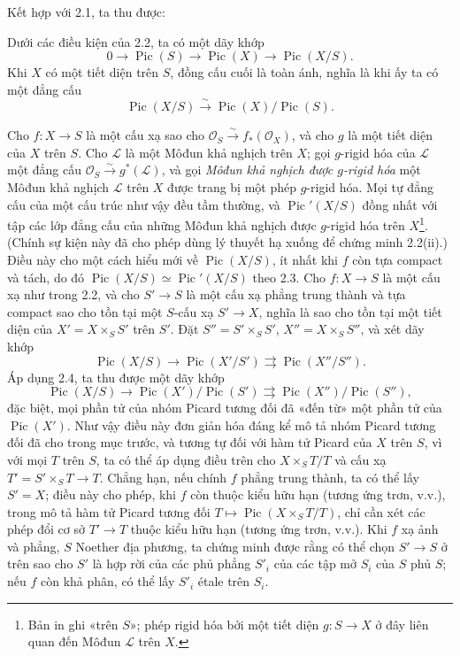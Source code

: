 Kết hợp với 2.1, ta thu được:

 Dưới các điều kiện của 2.2, ta có một dãy khớp
\[
0\longrightarrow\operatorname{Pic}(S)\longrightarrow\operatorname{Pic}(X)
\longrightarrow\operatorname{Pic}(X/S).
\]
Khi $X$ có một tiết diện trên $S$, đồng cấu cuối là toàn ánh, nghĩa là khi ấy
ta có một đẳng cấu
\[
\operatorname{Pic}(X/S)\xrightarrow{\sim}
\operatorname{Pic}(X)/\operatorname{Pic}(S).
\]

 Cho $f:X\longrightarrow S$ là một cấu xạ sao cho
$\mathcal O_S\xrightarrow{\sim}f_*(\mathcal O_X)$, và cho $g$ là một tiết
diện của $X$ trên $S$. Cho $\mathcal L$ là một Môđun khả nghịch trên $X$; gọi
$g$-rigid hóa của $\mathcal L$ một đẳng cấu
$\mathcal O_S\xrightarrow{\sim}g^*(\mathcal L)$, và gọi
\emph{Môđun khả nghịch được $g$-rigid hóa} một Môđun khả nghịch $\mathcal L$
trên $X$ được trang bị một phép $g$-rigid hóa. Mọi tự đẳng cấu của một cấu
trúc như vậy đều tầm thường, và
$\operatorname{Pic}'(X/S)$ đồng nhất với tập các lớp đẳng cấu của những Môđun
khả nghịch được $g$-rigid hóa trên $X$\footnote{Bản in ghi «trên $S$»; phép
rigid hóa bởi một tiết diện $g:S\to X$ ở đây liên quan đến Môđun
$\mathcal L$ trên $X$.}. (Chính sự kiện này đã cho phép dùng lý thuyết hạ
xuống để chứng minh 2.2(ii).) Điều này cho một cách hiểu mới về
$\operatorname{Pic}(X/S)$, ít nhất khi $f$ còn tựa compact và tách, do đó
$\operatorname{Pic}(X/S)\simeq\operatorname{Pic}'(X/S)$ theo 2.3.
 Cho $f:X\longrightarrow S$ là một cấu xạ như trong
2.2, và cho $S'\longrightarrow S$ là một cấu xạ phẳng trung thành và tựa
compact sao cho tồn tại một $S$-cấu xạ $S'\longrightarrow X$, nghĩa là sao cho
tồn tại một tiết diện của $X'=X\times_SS'$ trên $S'$. Đặt
$S''=S'\times_SS'$, $X''=X\times_SS''$, và xét dãy khớp
\[
\operatorname{Pic}(X/S)\longrightarrow\operatorname{Pic}(X'/S')
\rightrightarrows\operatorname{Pic}(X''/S'').
\]
Áp dụng 2.4, ta thu được một dãy khớp
\[
\operatorname{Pic}(X/S)\longrightarrow
\operatorname{Pic}(X')/\operatorname{Pic}(S')
\rightrightarrows
\operatorname{Pic}(X'')/\operatorname{Pic}(S''),
\]
đặc biệt, mọi phần tử của nhóm Picard tương đối đã «đến từ» một phần tử của
$\operatorname{Pic}(X')$. Như vậy điều này đơn giản hóa đáng kể mô tả nhóm
Picard tương đối đã cho trong mục trước, và tương tự đối với hàm tử Picard của
$X$ trên $S$, vì với mọi $T$ trên $S$, ta có thể áp dụng điều trên cho
$X\times_ST/T$ và cấu xạ $T'=S'\times_ST\longrightarrow T$. Chẳng hạn, nếu
chính $f$ phẳng trung thành, ta có thể lấy $S'=X$; điều này cho phép, khi $f$
còn thuộc kiểu hữu hạn (tương ứng trơn, v.v.), trong mô tả hàm tử Picard tương
đối $T\longmapsto\operatorname{Pic}(X\times_ST/T)$, chỉ cần xét các phép đổi
cơ sở $T'\longrightarrow T$ thuộc kiểu hữu hạn (tương ứng trơn, v.v.). Khi
$f$ xạ ảnh và phẳng, $S$ Noether địa phương, ta chứng minh được rằng có thể
chọn $S'\longrightarrow S$ ở trên sao cho $S'$ là hợp rời của các phủ phẳng
$S'_i$ của các tập mở $S_i$ của $S$ phủ $S$; nếu $f$ còn khả phân, có thể lấy $S'_i$
étale trên $S_i$.

